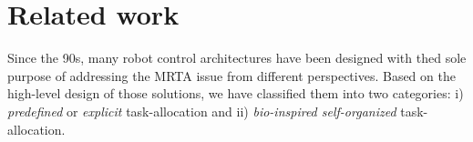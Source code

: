 \documentclass[journal]{IEEEtran}
\begin{document}
\section{Related work}
\label{sec:rw}
Since the 90s, many robot control architectures have been designed with thed sole purpose of addressing the MRTA issue from different perspectives. Based on the high-level design of those solutions, we have classified them into two categories: i) {\em predefined} or {\em explicit} task-allocation and ii) {\em bio-inspired self-organized} task-allocation. %
\end{document}
